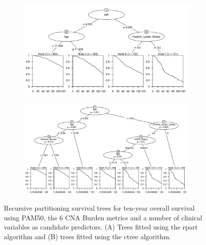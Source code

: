 \begin{figure}[!htb]
\centering

\vspace{1cm}

\begin{subfigure}{\textwidth}
\subcaption{}
\includegraphics[width=1\textwidth]{../figures/Appendices/Appendix_B/Clin_PartyKit_Survival_Burden_TenYearOS_PAM50.png}
\end{subfigure}

\vspace{2cm}

\begin{subfigure}{\textwidth}
\subcaption{}
\includegraphics[width=1\textwidth]{../figures/Appendices/Appendix_B/Clin_Ctree_Survival_Burden_TenYearOS_PAM50.png}
\end{subfigure}

\vspace{1cm}

\caption[Recursive partitioning survival trees for ten-year overall survival using PAM50, the 6 CNA Burden metrics and a number of clinical variables as candidate predictors.]{Recursive partitioning survival trees for ten-year overall survival using PAM50, the 6 CNA Burden metrics and a number of clinical variables as candidate predictors. (A) Trees fitted using the rpart algorithm and (B) trees fitted using the ctree algorithm.}
\end{figure}

